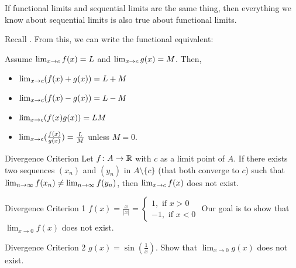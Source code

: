 If functional limits and sequential limits are the same thing, then everything we know about sequential limits is also true about functional limits.

Recall . From this, we can write the functional equivalent:

Assume \(\lim_{x \rightarrow c}f(x) = L\) and \(\lim_{x \rightarrow c}g(x) = M\). Then,
\begin{itemize}
    \item \(\lim_{x \rightarrow c}(f(x) + g(x)) = L + M\)
    \item \(\lim_{x \rightarrow c}(f(x) - g(x)) = L - M\)
    \item \(\lim_{x \rightarrow c}(f(x)g(x)) = LM\)
    \item \(\lim_{x \rightarrow c}(\frac{f(x)}{g(x)}) = \frac{L}{M}\) unless \(M = 0\).
\end{itemize}

\begin{ntheorem}
    {Divergence Criterion} Let \(f \colon A \rightarrow \mathbb{R}\) with \(c\) as a limit point of \(A\). If there exists two sequences \((x_n)\) and \((y_n)\) in \(A \setminus \{c\}\) (that both converge to \(c\)) such that \(\lim_{n \rightarrow \infty}f(x_n) \ne \lim_{n \rightarrow \infty}f(y_n)\), then \(\lim_{x \rightarrow c}f(x)\) does not exist.
\end{ntheorem}

\begin{example}
    {Divergence Criterion 1} \(f(x) = \frac{x}{|x|} = \begin{cases}
        1, \text{ if } x > 0 \\
        -1, \text{ if } x < 0
    \end{cases}\)
    Our goal is to show that \(\lim_{x \rightarrow 0} f(x)\) does not exist.
\end{example}


\begin{example}
    {Divergence Criterion 2} \(g(x) = \sin(\frac{1}{x})\). Show that \(\lim_{x \rightarrow 0} g(x)\) does not exist.
\end{example}




